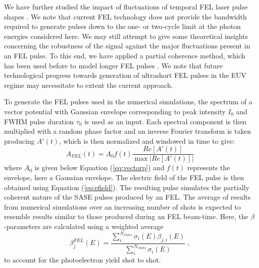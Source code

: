 We have further studied the impact of fluctuations of temporal FEL laser pulse shapes \cite{mitzner2008}. We note that current FEL technology does not provide the bandwidth required to generate pulses down to the one- or two-cycle limit at the photon energies considered here. We may still attempt to give some theoretical insights concerning the robustness of the signal against the major fluctuations present in an FEL pulse. To this end, we have applied a partial coherence method, which has been used before to model longer FEL pulses \cite{pfeiffer2010}. We note that future technological progress towards generation of ultrashort FEL pulses in the EUV regime may necessitate to extent the current approach.

To generate the FEL pulses used in the numerical simulations, the spectrum of a vector potential with Gaussian envelope corresponding to peak intensity $I_0$ and FWHM pulse duration $\tau_0$ is used as an input. Each spectral component is then multiplied with a random phase factor and an inverse Fourier transform is taken producing $A'(t)$, which is then normalized and windowed in time to give:
\begin{equation}
    A_{FEL}(t) = A_0 f(t)\frac{Re\left[A'(t)\right]}{\max|Re\left[A'(t)\right]|}
\end{equation}
where $A_0$ is given below Equation (\ref{eq:vectorp}) and $f(t)$ represents the envelope, here a Gaussian envelope. The electric field of the FEL pulse is then obtained using Equation (\ref{eq:efield}). The resulting pulse simulates the partially coherent nature of the SASE pulses produced by an FEL. 
The average of results from numerical simulations over an increasing number of shots is expected to resemble results similar to those produced during an FEL beam-time. Here, the $\beta$-parameters are calculated using a weighted average
% 
\begin{equation}
\beta_j^{FEL}(E) 
= 
\frac{\sum_i^{N_{shots}}  \sigma_i(E) \beta_{j,i}(E)}
{\sum_i^{N_{shots}}\sigma_i(E)}\; ,
    \label{eq:FEL_beta}
\end{equation}
% 
to account for the photoelectron yield shot to shot.

